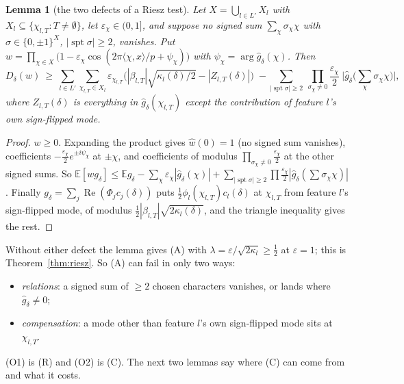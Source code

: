 \documentclass[11pt]{article}
\newtheorem{lemma}[theorem]{Lemma}
\theoremstyle{definition}
\renewcommand{\Re}{\operatorname{Re}}
\begin{document}
\begin{lemma}[the two defects of a Riesz test]\label{lem:defects}
Let $X=\bigcup_{l\in L'}X_l$ with $X_l\subseteq\{\chi_{l,T}:T\ne\emptyset\}$, let $\varepsilon_\chi\in(0,1]$, and suppose no signed sum
$\sum_\chi\sigma_\chi\chi$ with $\sigma\in\{0,\pm1\}^X$, $|\operatorname{spt}\sigma|\ge2$, vanishes.  Put
$w=\prod_{\chi\in X}\big(1-\varepsilon_\chi\cos(2\pi\langle\chi,x\rangle/p+\psi_\chi)\big)$ with $\psi_\chi=\arg\hat g_\delta(\chi)$.  Then
\[D_\delta(w)\ \ge\ \sum_{l\in L'}\sum_{\chi_{l,T}\in X_l}\varepsilon_{\chi_{l,T}}\Big(|\beta_{l,T}|\sqrt{\kappa_l(\delta)/2}-|Z_{l,T}(\delta)|\Big)\;-\sum_{|\operatorname{spt}\sigma|\ge2}\ \prod_{\sigma_\chi\ne0}\frac{\varepsilon_\chi}2\ \Big|\hat g_\delta\Big(\sum_\chi\sigma_\chi\chi\Big)\Big|,\]
where $Z_{l,T}(\delta)$ is everything in $\hat g_\delta(\chi_{l,T})$ except the contribution of feature $l$'s own sign-flipped mode.
\end{lemma}
\begin{proof}
$w\ge0$.  Expanding the product gives $\hat w(0)=1$ (no signed sum vanishes), coefficients $-\frac{\varepsilon_\chi}2e^{\pm i\psi_\chi}$ at
$\pm\chi$, and coefficients of modulus $\prod_{\sigma_\chi\ne0}\frac{\varepsilon_\chi}2$ at the other signed sums.  So
$\mathbb E[wg_\delta]\le\mathbb Eg_\delta-\sum_\chi\varepsilon_\chi|\hat g_\delta(\chi)|+\sum_{|\operatorname{spt}\sigma|\ge2}\prod\frac{\varepsilon_\chi}2|\hat g_\delta(\sum\sigma_\chi\chi)|$.  Finally
$g_\delta=\sum_j\Re(\Phi_jc_j(\delta))$ puts $\frac12\phi_l(\chi_{l,T})c_l(\delta)$ at $\chi_{l,T}$ from feature $l$'s sign-flipped mode, of modulus
$\frac12|\beta_{l,T}|\sqrt{2\kappa_l(\delta)}$, and the triangle inequality gives the rest.
\end{proof}
Without either defect the lemma gives (A) with $\lambda=\varepsilon/\sqrt{2\kappa_l}\ge\frac12$ at $\varepsilon=1$; this is
Theorem~\ref{thm:riesz}.  So (A) can fail in only two ways:
\begin{itemize}
\item[(R)] \emph{relations}: a signed sum of $\ge2$ chosen characters vanishes, or lands where $\hat g_\delta\ne0$;
\item[(C)] \emph{compensation}: a mode other than feature $l$'s own sign-flipped mode sits at $\chi_{l,T}$.
\end{itemize}
(O1) is (R) and (O2) is (C).  The next two lemmas say where (C) can come from and what it costs.
\end{document}
